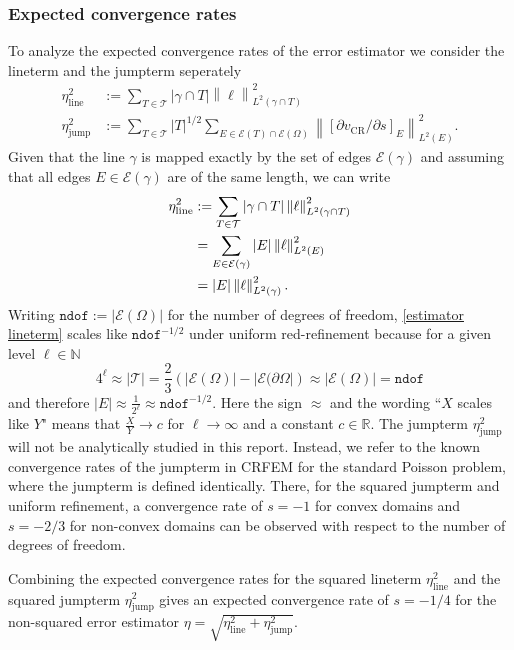 \documentclass[11pt,a4paper]{article}
\newcommand{\vCR}{v_{\mathrm{CR}}}
\newcommand{\norm}[1]{\left \lVert #1 \right \rVert}
\newcommand{\Ltwo}[2]{\left\lVert #1 \right\rVert_{L^2(#2)}}
\begin{document}
\subsubsection{Expected convergence rates}
\label{subsubsec: expected convergence rates}
To analyze the expected convergence rates of the error estimator we consider the lineterm and the jumpterm seperately 
\begin{align*}
\eta_{\text{line}}^2 &:=  \sum_{T \in \mathcal{T}} |\gamma \cap T| \Ltwo{\ell}{\gamma \cap T}^2 \\
\eta_{\text{jump}}^2 &:= \sum_{T \in \mathcal{T}} |T|^{1/2} \sum_{E \in \mathcal{E}(T) \cap \mathcal{E}(\Omega)} \norm{[\partial \vCR/\partial s]_E}^2_{L^2(E)}.
\end{align*}
Given that the line \(\gamma\) is mapped exactly by the set of edges \(\mathcal{E}(\gamma)\) and assuming that all edges \(E \in \mathcal{E}(\gamma)\) are of the same length, we can write 
\begin{align}
\eta_{\text{line}}^2 &:=  \sum_{T \in \mathcal{T}} |\gamma \cap T| \Ltwo{\ell}{\gamma \cap T}^2 \notag\\
&= \sum_{E \in \mathcal{E}(\gamma)} |E| \Ltwo{\ell}{E}^2 \notag\\
&= |E| \Ltwo{\ell}{\gamma}^2. \label{estimator lineterm}
\end{align}
Writing \(\texttt{ndof} := |\mathcal{E}(\Omega)|\) for the number of degrees of freedom, \eqref{estimator lineterm}  scales like \(\texttt{ndof}^{-1/2}\) under uniform red-refinement because for a given level \(\ell \in \mathbb{N}\)
\[4^{\mathrm{\ell}} \approx |\mathcal{T}| = \frac{2}{3}( |\mathcal{E}(\Omega)| - |\mathcal{E}(\partial \Omega|) \approx |\mathcal{E}(\Omega)| = \texttt{ndof}\]
and therefore \(|E| \approx \frac{1}{2^{\ell}} \approx \texttt{ndof}^{-1/2}\). Here the sign \(\approx\) and the wording ``\(X\) scales like \(Y\)" means that \(\frac{X}{Y} \rightarrow c\) for \(\ell \rightarrow \infty\) and a constant \(c \in \mathbb{R}\).
The jumpterm \(\eta_{\text{jump}}^2\) will not be analytically studied in this report. Instead, we refer to the known convergence rates of the jumpterm in CRFEM for the standard Poisson problem, where the jumpterm is defined identically. There, for the squared jumpterm and uniform refinement, a convergence rate of \(s=-1\) for convex domains and \(s=-2/3\) for non-convex domains can be observed with respect to the number of degrees of freedom. 

Combining the expected convergence rates for the squared lineterm \(\eta_\text{line}^2\) and the squared jumpterm \(\eta_\text{jump}^2\) gives an expected convergence rate of \(s=-1/4\) for the non-squared error estimator \(\eta = \sqrt{\eta_\text{line}^2 + \eta_\text{jump}^2}\).
\end{document}
